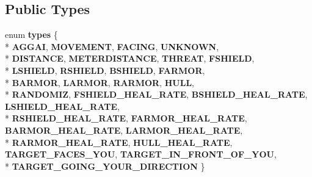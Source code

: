 \subsection*{Public Types}
\begin{DoxyCompactItemize}
\item 
enum {\bfseries types} \{ \\*
{\bfseries A\+G\+G\+AI}, 
{\bfseries M\+O\+V\+E\+M\+E\+NT}, 
{\bfseries F\+A\+C\+I\+NG}, 
{\bfseries U\+N\+K\+N\+O\+WN}, 
\\*
{\bfseries D\+I\+S\+T\+A\+N\+CE}, 
{\bfseries M\+E\+T\+E\+R\+D\+I\+S\+T\+A\+N\+CE}, 
{\bfseries T\+H\+R\+E\+AT}, 
{\bfseries F\+S\+H\+I\+E\+LD}, 
\\*
{\bfseries L\+S\+H\+I\+E\+LD}, 
{\bfseries R\+S\+H\+I\+E\+LD}, 
{\bfseries B\+S\+H\+I\+E\+LD}, 
{\bfseries F\+A\+R\+M\+OR}, 
\\*
{\bfseries B\+A\+R\+M\+OR}, 
{\bfseries L\+A\+R\+M\+OR}, 
{\bfseries R\+A\+R\+M\+OR}, 
{\bfseries H\+U\+LL}, 
\\*
{\bfseries R\+A\+N\+D\+O\+M\+IZ}, 
{\bfseries F\+S\+H\+I\+E\+L\+D\+\_\+\+H\+E\+A\+L\+\_\+\+R\+A\+TE}, 
{\bfseries B\+S\+H\+I\+E\+L\+D\+\_\+\+H\+E\+A\+L\+\_\+\+R\+A\+TE}, 
{\bfseries L\+S\+H\+I\+E\+L\+D\+\_\+\+H\+E\+A\+L\+\_\+\+R\+A\+TE}, 
\\*
{\bfseries R\+S\+H\+I\+E\+L\+D\+\_\+\+H\+E\+A\+L\+\_\+\+R\+A\+TE}, 
{\bfseries F\+A\+R\+M\+O\+R\+\_\+\+H\+E\+A\+L\+\_\+\+R\+A\+TE}, 
{\bfseries B\+A\+R\+M\+O\+R\+\_\+\+H\+E\+A\+L\+\_\+\+R\+A\+TE}, 
{\bfseries L\+A\+R\+M\+O\+R\+\_\+\+H\+E\+A\+L\+\_\+\+R\+A\+TE}, 
\\*
{\bfseries R\+A\+R\+M\+O\+R\+\_\+\+H\+E\+A\+L\+\_\+\+R\+A\+TE}, 
{\bfseries H\+U\+L\+L\+\_\+\+H\+E\+A\+L\+\_\+\+R\+A\+TE}, 
{\bfseries T\+A\+R\+G\+E\+T\+\_\+\+F\+A\+C\+E\+S\+\_\+\+Y\+OU}, 
{\bfseries T\+A\+R\+G\+E\+T\+\_\+\+I\+N\+\_\+\+F\+R\+O\+N\+T\+\_\+\+O\+F\+\_\+\+Y\+OU}, 
\\*
{\bfseries T\+A\+R\+G\+E\+T\+\_\+\+G\+O\+I\+N\+G\+\_\+\+Y\+O\+U\+R\+\_\+\+D\+I\+R\+E\+C\+T\+I\+ON}
 \}\hypertarget{classOrders_1_1AggressiveAI_a4486de18fcb4a05c27b485a6453e93d9}{}\label{classOrders_1_1AggressiveAI_a4486de18fcb4a05c27b485a6453e93d9}

\end{DoxyCompactItemize}
